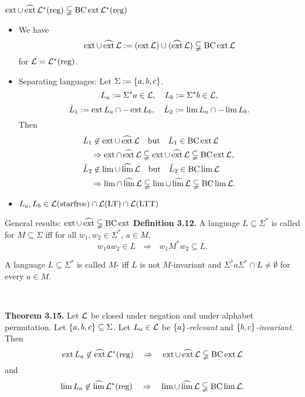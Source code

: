 \documentclass[
	notheorems,noamsthm]{beamer}
\begin{document}
\begin{frame}[<+->]{$\operatorname{ext} \cup \operatorname{\widehat{ext}} \mathcal{L}^*(\textup{\textrm{reg}}) \subsetneqq \operatorname{BC} \operatorname{ext} \mathcal{L}^*(\textup{\textrm{reg}})$}
\begin{itemize}
\item
We have
\[ \operatorname{ext} \cup \operatorname{\widehat{ext}} \mathcal{L} := (\operatorname{ext} \mathcal{L}) \cup (\operatorname{\widehat{ext}} \mathcal{L}) \subsetneqq \operatorname{BC} \operatorname{ext} \mathcal{L} \]
for $\mathcal{L} = \mathcal{L}^*(\textup{\textrm{reg}})$.

\item
Separating languages: Let $\Sigma := \Set{a,b,c}$.
\[ L_a := \Sigma^* a \in \mathcal{L}, \ \ \ L_b := \Sigma^* b \in \mathcal{L}, \]
\[ \tilde L_1 := \ext L_a \cap -\ext L_b, \ \ \ \tilde L_2 := \lim L_a \cap -\lim L_b . \]
Then
\begin{align*}
& \tilde L_1 \not\in \ext \cup \dext \Lang \ \ \text{ but } \ \ \tilde L_1 \in \BC \ext \Lang \\ 
& \ \ \ \Rightarrow \ext \cap \dext \Lang \subsetneqq \ext \cup \dext \Lang \subsetneqq \BC \ext \Lang , \\
& \tilde L_2 \not\in \lim \cup \dlim \Lang \ \ \text{ but } \ \ \tilde L_2 \in \BC \lim \Lang \\
& \ \ \ \Rightarrow \lim \cap \dlim \Lang \subsetneqq \lim \cup \dlim \Lang \subsetneqq \BC \lim \Lang .
\end{align*}

\item
$L_a,L_b \in \mathcal{L}(\textup{\textrm{starfree}}) \cap \mathcal{L}(\textup{\textrm{LT}}) \cap \mathcal{L}(\textup{\textrm{LTT}})$
\end{itemize}
\end{frame}

\begin{frame}[<+->]{General results: $\operatorname{ext} \cup \operatorname{\widehat{ext}} \subsetneqq \operatorname{BC} \operatorname{ext}$}
\textbf{Definition 3.12.} A language $L \subseteq \Sigma^*$ is called  for $M \subseteq\Sigma$ iff for all $w_1,w_2 \in \Sigma^*$, $a \in M$,
\[ w_1 a w_2 \in L \ \ \ \Rightarrow \ \ \  w_1 M^* w_2 \subseteq L . \]

A language $L \subseteq \Sigma^*$ is called $M$- iff $L$ is not $M$-invariant and $\Sigma^* a \Sigma^* \cap L \ne \emptyset$ for every $a \in M$.

\

\textbf{Theorem 3.15.} Let $\mathcal{L}$ be closed under negation and under alphabet permutation. Let $\Set{a,b,c} \subseteq \Sigma$. Let $L_a \in \mathcal{L}$ be \emph{$\Set{a}$-relevant} and \emph{$\Set{b,c}$-invariant}. Then
\[ \operatorname{ext} L_a \not\in \operatorname{\widehat{ext}} \mathcal{L}^*(\textup{\textrm{reg}}) \ \ \ \Rightarrow \ \ \ \operatorname{ext} \cup \operatorname{\widehat{ext}} \mathcal{L} \subsetneqq \operatorname{BC} \operatorname{ext} \mathcal{L} \]
and
\[ \lim L_a \not\in \dlim \Langreg \ \ \ \Rightarrow \ \ \ \lim \cup \dlim \Lang \subsetneqq \BC \lim \Lang . \]
\end{frame}
\end{document}
